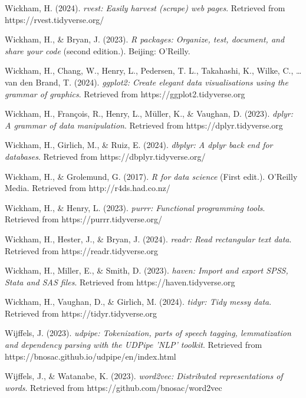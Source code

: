 \documentclass[
  letterpaper,
  krantz1]{latex/krantz-mod}
\newlength{\cslhangindent}
\newenvironment{CSLReferences}[2] %
 {\begin{list}{}{%
  \setlength{\itemindent}{0pt}
  \setlength{\leftmargin}{0pt}
  \setlength{\parsep}{0pt}
  \ifodd #1
   \setlength{\leftmargin}{\cslhangindent}
   \setlength{\itemindent}{-1\cslhangindent}
  \fi
  \setlength{\itemsep}{#2\baselineskip}}}
 {\end{list}}
\theoremstyle{definition}
\theoremstyle{definition}
\theoremstyle{remark}
\begin{document}
\begin{CSLReferences}{1}{0}
Wickham, H. (2024). \emph{{rvest}: Easily harvest (scrape) web pages}.
Retrieved from https://rvest.tidyverse.org/

Wickham, H., \& Bryan, J. (2023). \emph{R packages: Organize, test,
document, and share your code} (second edition.). Beijing: O'Reilly.

Wickham, H., Chang, W., Henry, L., Pedersen, T. L., Takahashi, K.,
Wilke, C., \ldots{} van den Brand, T. (2024). \emph{{ggplot2}: Create
elegant data visualisations using the grammar of graphics}. Retrieved
from https://ggplot2.tidyverse.org

Wickham, H., François, R., Henry, L., Müller, K., \& Vaughan, D. (2023).
\emph{{dplyr}: A grammar of data manipulation}. Retrieved from
https://dplyr.tidyverse.org

Wickham, H., Girlich, M., \& Ruiz, E. (2024). \emph{{dbplyr}: A dplyr
back end for databases}. Retrieved from https://dbplyr.tidyverse.org/

Wickham, H., \& Grolemund, G. (2017). \emph{R for data science} (First
edit.). O'Reilly Media. Retrieved from http://r4ds.had.co.nz/

Wickham, H., \& Henry, L. (2023). \emph{{purrr}: Functional programming
tools}. Retrieved from https://purrr.tidyverse.org/

Wickham, H., Hester, J., \& Bryan, J. (2024). \emph{{readr}: Read
rectangular text data}. Retrieved from https://readr.tidyverse.org

Wickham, H., Miller, E., \& Smith, D. (2023). \emph{{haven}: Import and
export {SPSS}, {Stata} and {SAS} files}. Retrieved from
https://haven.tidyverse.org

Wickham, H., Vaughan, D., \& Girlich, M. (2024). \emph{{tidyr}: Tidy
messy data}. Retrieved from https://tidyr.tidyverse.org

Wijffels, J. (2023). \emph{{udpipe}: Tokenization, parts of speech
tagging, lemmatization and dependency parsing with the {UDPipe} 'NLP'
toolkit}. Retrieved from https://bnosac.github.io/udpipe/en/index.html

Wijffels, J., \& Watanabe, K. (2023). \emph{{word2vec}: Distributed
representations of words}. Retrieved from
https://github.com/bnosac/word2vec


\end{CSLReferences}
\end{document}
